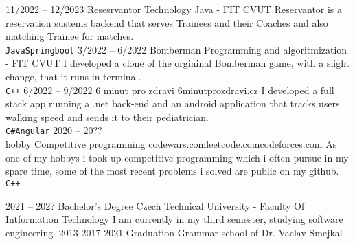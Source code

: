 \documentclass[9pt]{developercv} %
\begin{document}



\begin{entrylist}
	\entry
		{11/2022 -- 12/2023}
		{Resesrvantor}
		{Technology Java - FIT CVUT}
		{Reservantor is a reservation sustems backend that serves Trainees and their Coaches and also matching Trainee for matches.\\ \texttt{Java}\slashsep\texttt{Springboot}}
	\entry
		{3/2022 -- 6/2022}
		{Bomberman}
		{Programming and algoritmization - FIT CVUT}
		{I developed a clone of the orgininal Bomberman game, with a slight change, that it runs in terminal.\\ \texttt{C++}}
	\entry
		{6/2022 -- 9/2022}
		{6 minut pro zdravi}
		{6minutprozdravi.cz}
		{I developed a full stack app running a .net back-end and an android application that tracks users walking speed and sends it to their pediatrician.\\ \texttt{C\#}\slashsep\texttt{Angular}}
	\entry
		{2020 -- 20??\\\footnotesize{hobby}}
		{Competitive programming}
		{codewars.com\slashsep leetcode.com\slashsep codeforces.com}
		{As one of my hobbys i took up competitive programming which i often pursue in my spare time, some of the most recent problems i solved are public on my github. \\ \texttt{C++}}
\end{entrylist}



\begin{entrylist}
	\entry
		{2021 -- 202?}
		{Bachelor's Degree}
		{Czech Technical University - Faculty Of Intformation Technology}
		{I am currently in my third semester, studying software engineering.}
	\entry
		{2013-2017-2021}
		{Graduation}
		{Grammar school of Dr. Vaclav Smejkal}
		{}
\end{entrylist}
\end{document}
